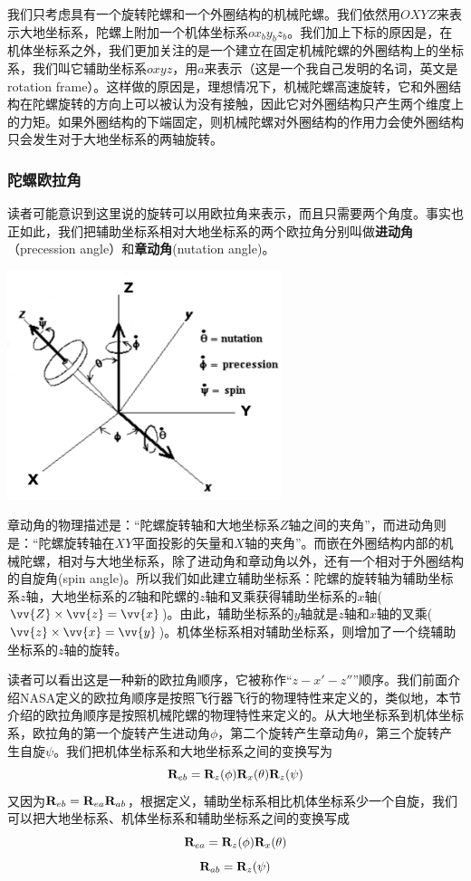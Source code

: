 \documentclass[11pt]{article}
\begin{document}
我们只考虑具有一个旋转陀螺和一个外圈结构的机械陀螺。我们依然用$OXYZ$来表示大地坐标系，陀螺上附加一个机体坐标系$ox_by_bz_b$。我们加上下标的原因是，在机体坐标系之外，我们更加关注的是一个建立在固定机械陀螺的外圈结构上的坐标系，我们叫它辅助坐标系$oxyz$，用$a$来表示（这是一个我自己发明的名词，英文是rotation frame）。这样做的原因是，理想情况下，机械陀螺高速旋转，它和外圈结构在陀螺旋转的方向上可以被认为没有接触，因此它对外圈结构只产生两个维度上的力矩。如果外圈结构的下端固定，则机械陀螺对外圈结构的作用力会使外圈结构只会发生对于大地坐标系的两轴旋转。
\subsubsection{陀螺欧拉角}
读者可能意识到这里说的旋转可以用欧拉角来表示，而且只需要两个角度。事实也正如此，我们把辅助坐标系相对大地坐标系的两个欧拉角分别叫做\textbf{进动角}（precession angle）和\textbf{章动角}(nutation angle)。

\begin{center}
\includegraphics[width=0.6\textwidth]{images/gyroframe1.png}
\end{center}

章动角的物理描述是：“陀螺旋转轴和大地坐标系$Z$轴之间的夹角”，而进动角则是：“陀螺旋转轴在$XY$平面投影的矢量和$X$轴的夹角”。而嵌在外圈结构内部的机械陀螺，相对与大地坐标系，除了进动角和章动角以外，还有一个相对于外圈结构的自旋角(spin angle)。所以我们如此建立辅助坐标系：陀螺的旋转轴为辅助坐标系$z$轴，大地坐标系的$Z$轴和陀螺的$z$轴和叉乘获得辅助坐标系的$x$轴($\vv{Z} \times \vv{z} = \vv{x}$)。由此，辅助坐标系的$y$轴就是$z$轴和$x$轴的叉乘($\vv{z} \times \vv{x} = \vv{y}$)。机体坐标系相对辅助坐标系，则增加了一个绕辅助坐标系的$z$轴的旋转。

读者可以看出这是一种新的欧拉角顺序，它被称作“$z-x'-z''$”顺序。我们前面介绍NASA定义的欧拉角顺序是按照飞行器飞行的物理特性来定义的，类似地，本节介绍的欧拉角顺序是按照机械陀螺的物理特性来定义的。从大地坐标系到机体坐标系，欧拉角的第一个旋转产生进动角$\phi$，第二个旋转产生章动角$\theta$，第三个旋转产生自旋$\psi$。我们把机体坐标系和大地坐标系之间的变换写为
$$
{\bf R}_{eb} = {\bf R}_z(\phi){\bf R}_x(\theta){\bf R}_z(\psi)
$$
又因为${\bf R}_{eb} = {\bf R}_{ea}{\bf R}_{ab}$，根据定义，辅助坐标系相比机体坐标系少一个自旋，我们可以把大地坐标系、机体坐标系和辅助坐标系之间的变换写成
$$
{\bf R}_{ea} = {\bf R}_z(\phi){\bf R}_x(\theta)
$$
$$
{\bf R}_{ab} = {\bf R}_z(\psi)
$$
\end{document}
